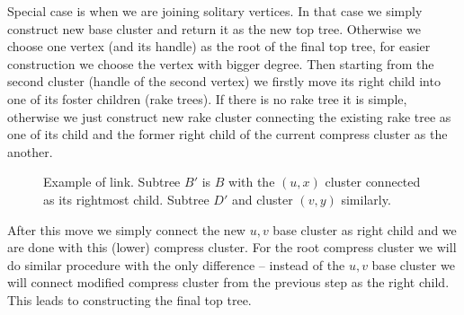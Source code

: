 Special case is when we are joining solitary vertices. In that case we simply
construct new base cluster and return it as the new top tree.
Otherwise we choose one vertex (and its handle) as the root of the final top tree,
for easier construction we choose the vertex with bigger degree. Then starting
from the second cluster (handle of the second vertex) we firstly move its right
child into one of its foster children (rake trees). If there is no rake tree it
is simple, otherwise we just construct new rake cluster connecting the existing
rake tree as one of its child and the former right child of the current compress
cluster as the another.

\begin{figure}[H]
\centering
{}
\caption[Example of link]
{Example of link. Subtree $B'$ is $B$ with the $(u,x)$ cluster connected
as its rightmost child. Subtree $D'$ and cluster $(v,y)$ similarly.}
\end{figure}
\vskip-7pt %

After this move we simply connect the new $u,v$ base cluster as right child and
we are done with this (lower) compress cluster. For the root compress cluster we
will do similar procedure with the only difference -- instead of the $u,v$ base
cluster we will connect modified compress cluster from the previous step as the
right child. This leads to constructing the final top tree.
